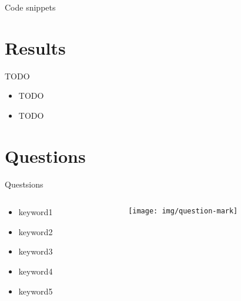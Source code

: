 \documentclass{beamer}
\begin{document}
\begin{frame}{Code snippets}
	
\end{frame}
	
\section{Results}

\begin{frame}{TODO}
	\begin{itemize}
		\item TODO
		\item TODO
	\end{itemize}
\end{frame}

\section{Questions}

\begin{frame}{Questsions}
  \begin{columns}
    \begin{column}[l]{0.5\textwidth}
      \begin{itemize}
        \item keyword1
        \item keyword2
        \item keyword3
        \item keyword4
        \item keyword5
      \end{itemize}
    \end{column}
    \begin{column}[c]{0.5\textwidth}
      \begin{figure}
        \texttt{[image: img/question-mark]}
      \end{figure}
    \end{column}
  \end{columns}
\end{frame}
\end{document}
